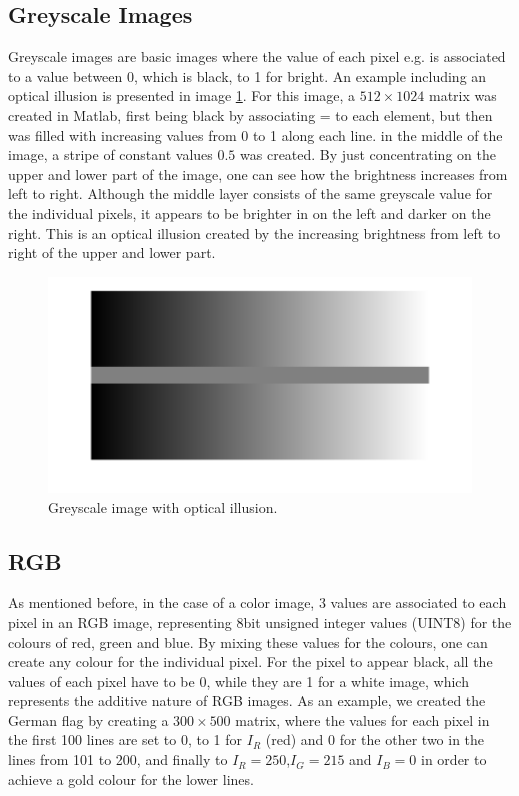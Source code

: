 \subsection{Greyscale Images}
Greyscale images are basic images where the value of each pixel e.g. is associated to a value between 0, which is black, to 1 for bright. An example including an optical illusion is presented in image \ref{fig:greyillusion}. For this image, a $512\times 1024$ matrix was created in Matlab, first being black by associating = to each element, but then was filled with increasing values from 0 to 1 along each line. in the middle of the image, a stripe of  constant values $0.5$ was created. By just concentrating on the upper and lower part of the image, one can see how the brightness increases from left to right. Although the middle layer consists of the same greyscale value for the individual pixels, it appears to be brighter in on the left and darker on the right. This is an optical illusion created by the increasing brightness from left to right of the upper and lower part.

\begin{figure}[H]
	\centering
		\includegraphics[width=\textwidth]{images/greyillusion.png}
		\caption{Greyscale image with optical illusion.}
		\label{fig:greyillusion}
\end{figure}

\subsection{RGB}
As mentioned before, in the case of a color image, 3 values are associated to each pixel in an RGB image, representing 8bit unsigned integer values (UINT8) for the colours of red, green and blue. By mixing these values for the colours, one can create any colour for the individual pixel. For the pixel to appear black, all the values of each pixel have to be 0, while they are 1 for a white image, which represents the additive nature of RGB images. As an example, we created the German flag by creating a $300\times500$ matrix, where the values for each pixel in the first 100 lines are set to 0, to 1 for $I_{R}$ (red) and  0 for the other two in the lines from 101 to 200, and finally to $I_{R}=250$,$ I_{G}=215$ and $I_{B}=0$ in order to achieve a gold colour for the lower lines. 

